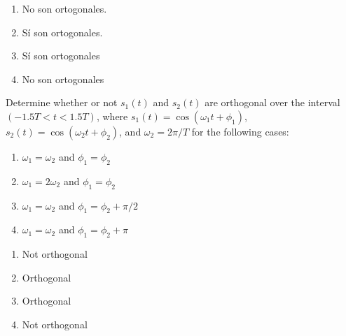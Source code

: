\documentclass[es,boletin]{uah}
\begin{document}
{
	\begin{enumerate}
		\item No son ortogonales.
  		\item Sí son ortogonales.
    	\item Sí son ortogonales
     	\item No son ortogonales
	\end{enumerate}
}
{
	\cite{Sklar} Determine whether or not $s_1(t)$ and $s_2(t)$ are orthogonal over the interval $(-1.5T<t<1.5T)$, where $s_1(t) = \cos(\omega_1 t + \phi_1)$, $s_2(t) = \cos(\omega_2 t + \phi_2)$, and $\omega_2 = 2\pi/T$ for the following cases:

	\begin{enumerate}
		\item $\omega_1 = \omega_2$ and $\phi_1 = \phi_2$
  		\item $\omega_1 = 2 \omega_2$ and $\phi_1 = \phi_2$
    	\item $\omega_1 = \omega_2$ and $\phi_1 = \phi_2 + \pi/2$
     	\item $\omega_1 = \omega_2$ and $\phi_1 = \phi_2 + \pi$
	\end{enumerate}
}
{
	\begin{enumerate}
		\item Not orthogonal
  		\item Orthogonal
    	\item Orthogonal
     	\item Not orthogonal
	\end{enumerate}
}

\newpage
\end{document}
